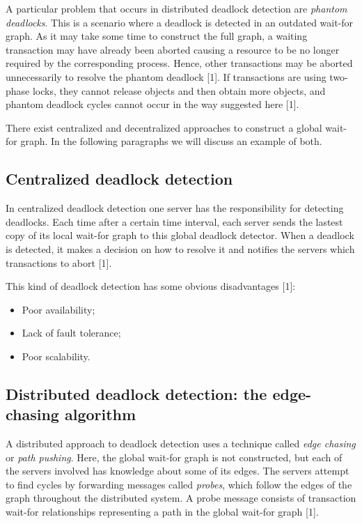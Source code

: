 A particular problem that occurs in distributed deadlock detection are \emph{phantom deadlocks}. This is a scenario where a deadlock is detected in an outdated wait-for graph. As it may take some time to construct the full graph, a waiting transaction may have already been aborted causing a resource to be no longer required by the corresponding process. Hence, other transactions may be aborted unnecessarily to resolve the phantom deadlock [1]. If transactions are using two-phase locks, they cannot release objects and then obtain more objects, and phantom deadlock cycles cannot occur in the way suggested here [1].

There exist centralized and decentralized approaches to construct a global wait-for graph. In the following paragraphs we will discuss an example of both.


\subsection{Centralized deadlock detection}

In centralized deadlock detection one server has the responsibility for detecting deadlocks. Each time after a certain time interval, each server sends the lastest copy of its local wait-for graph to this global deadlock detector. When a deadlock is detected, it makes a decision on how to resolve it and notifies the servers which transactions to abort [1].

This kind of deadlock detection has some obvious disadvantages [1]:
\begin{itemize}
	\item Poor availability;
	\item Lack of fault tolerance;
	\item Poor scalability.
\end{itemize}


\subsection{Distributed deadlock detection: the edge-chasing algorithm}

A distributed approach to deadlock detection uses a technique called \emph{edge chasing} or \emph{path pushing}. Here, the global wait-for graph is not constructed, but each of the servers involved has knowledge about some of its edges. The servers attempt to find cycles by forwarding messages called \emph{probes}, which follow the edges of the graph throughout the distributed system. A probe message consists of transaction wait-for relationships representing a path in the global wait-for graph [1].

